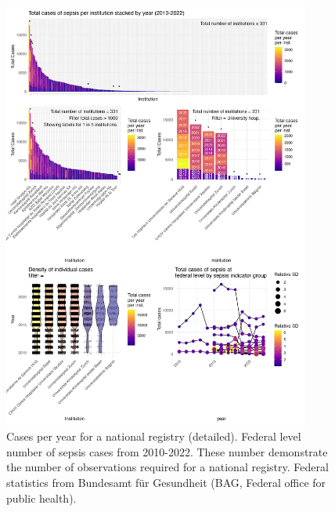 \begin{figure}[h] \hspace*{0cm} 
\begin{center}
	\includegraphics[width=0.90\textwidth]{../stats/foph_key_stats/output/p_patch_year_case_inst_variability_main}
	\caption{Cases per year for a national registry (detailed). Federal level number of sepsis cases from 2010-2022. These number demonstrate the number of observations required for a national registry. Federal statistics from Bundesamt für Gesundheit (BAG, Federal office for public health).}
	\label{fig:national_registry2}
\end{center}
\end{figure}

